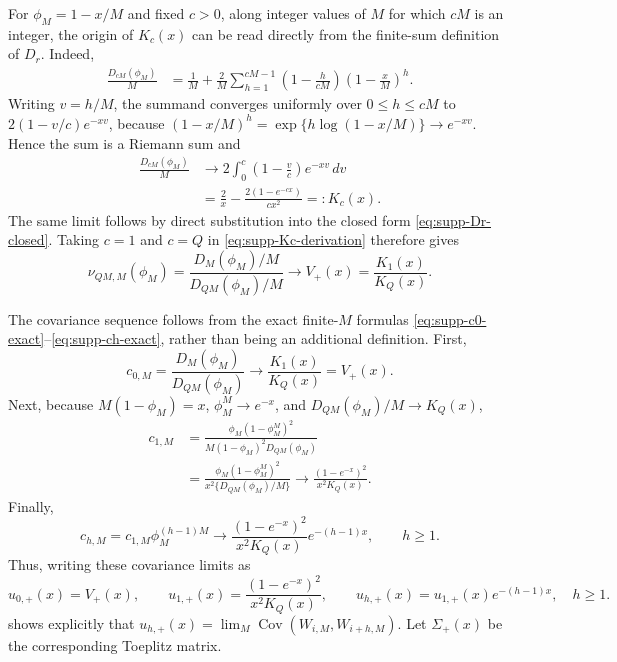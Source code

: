 \documentclass[12pt]{article}
\theoremstyle{remark}
\begin{document}
For $\phi_M=1-x/M$ and fixed $c>0$, along integer values of $M$ for which $cM$ is an integer, the origin of $K_c(x)$ can be read directly from the finite-sum definition of $D_r$. Indeed,
\begin{align*}
\frac{D_{cM}(\phi_M)}{M}
&=\frac1M+\frac2M\sum_{h=1}^{cM-1}
\left(1-\frac{h}{cM}\right)
\left(1-\frac{x}{M}\right)^h.
\end{align*}
Writing $v=h/M$, the summand converges uniformly over $0\le h\le cM$ to
$2(1-v/c)e^{-xv}$, because
$(1-x/M)^h=\exp\{h\log(1-x/M)\}\to e^{-xv}$. Hence the sum is a Riemann sum and
\begin{align}
\frac{D_{cM}(\phi_M)}{M}
&\longrightarrow
2\int_0^c\left(1-\frac{v}{c}\right)e^{-xv}\,dv \nonumber\\
&=\frac2x-\frac{2(1-e^{-cx})}{cx^2}
=:K_c(x).
\label{eq:supp-Kc-derivation}
\end{align}
The same limit follows by direct substitution into the closed form \eqref{eq:supp-Dr-closed}. Taking $c=1$ and $c=Q$ in \eqref{eq:supp-Kc-derivation} therefore gives
\begin{equation*}
\nu_{QM,M}(\phi_M)
=\frac{D_M(\phi_M)/M}{D_{QM}(\phi_M)/M}
\longrightarrow V_+(x)=\frac{K_1(x)}{K_Q(x)}.
\end{equation*}

The covariance sequence follows from the exact finite-$M$ formulas \eqref{eq:supp-c0-exact}--\eqref{eq:supp-ch-exact}, rather than being an additional definition. First,
\[
c_{0,M}=\frac{D_M(\phi_M)}{D_{QM}(\phi_M)}\longrightarrow
\frac{K_1(x)}{K_Q(x)}=V_+(x).
\]
Next, because $M(1-\phi_M)=x$, $\phi_M^M\to e^{-x}$, and $D_{QM}(\phi_M)/M\to K_Q(x)$,
\begin{align*}
c_{1,M}
&=\frac{\phi_M(1-\phi_M^M)^2}
{M(1-\phi_M)^2D_{QM}(\phi_M)}\\
&=\frac{\phi_M(1-\phi_M^M)^2}
{x^2\{D_{QM}(\phi_M)/M\}}
\longrightarrow
\frac{(1-e^{-x})^2}{x^2K_Q(x)}.
\end{align*}
Finally,
\[
c_{h,M}=c_{1,M}\phi_M^{(h-1)M}
\longrightarrow
\frac{(1-e^{-x})^2}{x^2K_Q(x)}e^{-(h-1)x},
\qquad h\ge1.
\]
Thus, writing these covariance limits as
\begin{equation*}
u_{0,+}(x)=V_+(x),\qquad
u_{1,+}(x)=\frac{(1-e^{-x})^2}{x^2K_Q(x)},\qquad
u_{h,+}(x)=u_{1,+}(x)e^{-(h-1)x},\quad h\ge1.
\end{equation*}
shows explicitly that $u_{h,+}(x)=\lim_M\operatorname{Cov}(W_{i,M},W_{i+h,M})$. Let $\Sigma_+(x)$ be the corresponding Toeplitz matrix.
\end{document}
